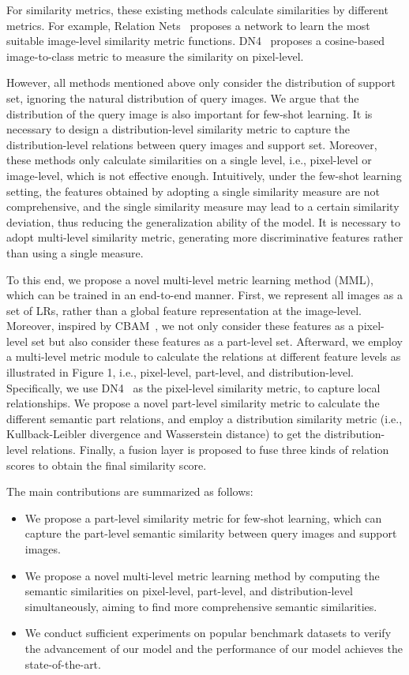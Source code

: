 \documentclass[10pt,twocolumn,letterpaper]{article}
\begin{document}
For similarity metrics, these existing methods calculate similarities by different metrics. For example, Relation Nets~\cite{sung2018learning} proposes a network to learn the most suitable image-level similarity metric functions. DN4~\cite{chen2020multi} proposes a cosine-based image-to-class metric to measure the similarity on pixel-level.

However, all methods mentioned above only consider the distribution of support set, ignoring the natural distribution of query images. We argue that the distribution of the query image is also important for few-shot learning. It is necessary to design a distribution-level similarity metric to capture the distribution-level relations between query images and support set. Moreover, these methods only calculate similarities on a single level, i.e., pixel-level or image-level, which is not effective enough. Intuitively, under the few-shot learning setting, the features obtained by adopting a single similarity measure are not comprehensive, and the single similarity measure may lead to a certain similarity deviation, thus reducing the generalization ability of the model. It is necessary to adopt multi-level similarity metric, generating more discriminative features rather than using a single measure.

To this end, we propose a novel multi-level metric learning method (MML), which can be trained in an end-to-end manner. First, we represent all images as a set of LRs, rather than a global feature representation at the image-level. Moreover, inspired by CBAM~\cite{eccvWooPLK18}, we not only consider these features as a pixel-level set but also consider these features as a part-level set. Afterward, we employ a multi-level metric module to calculate the relations at different feature levels as illustrated in Figure 1, i.e., pixel-level, part-level, and distribution-level. Specifically, we use DN4~\cite{li2019revisiting} as the pixel-level similarity metric, to capture local relationships. We propose a novel part-level similarity metric to calculate the different semantic part relations, and employ a distribution similarity metric (i.e., Kullback-Leibler divergence and Wasserstein distance) to get the distribution-level relations. Finally, a fusion layer is proposed to fuse three kinds of relation scores to obtain the final similarity score.

The main contributions are summarized as follows:
\begin{itemize}
	\setlength{\itemsep}{0pt}
	\setlength{\parsep}{0pt}
	\setlength{\parskip}{0pt}
	\item We propose a part-level similarity metric for few-shot learning, which can capture the part-level semantic similarity between query images and support images.
	\item We propose a novel multi-level metric learning method by computing the semantic similarities on pixel-level, part-level, and distribution-level simultaneously, aiming to find more comprehensive semantic similarities.
	\item We conduct sufficient experiments on popular benchmark datasets to verify the advancement of our model and the performance of our model achieves the state-of-the-art.
\end{itemize}
\end{document}
